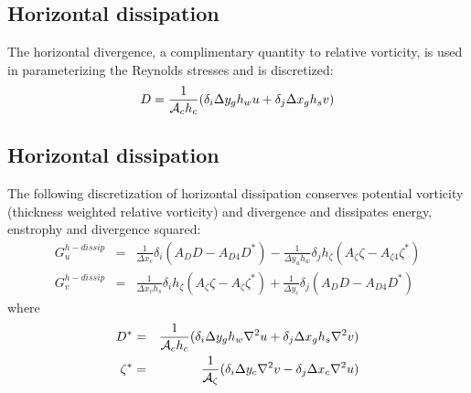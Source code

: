 \subsection{Horizontal dissipation}

The horizontal divergence, a complimentary quantity to relative
vorticity, is used in parameterizing the Reynolds stresses and is
discretized:
\begin{equation}
D = \frac{1}{{\cal A}_c h_c} (
  \delta_i \Delta y_g h_w u
+ \delta_j \Delta x_g h_s v )
\end{equation}



\subsection{Horizontal dissipation}

The following discretization of horizontal dissipation conserves
potential vorticity (thickness weighted relative vorticity) and
divergence and dissipates energy, enstrophy and divergence squared:
\begin{eqnarray}
G_u^{h-dissip} & = &
  \frac{1}{\Delta x_c} \delta_i ( A_D D - A_{D4} D^*)
- \frac{1}{\Delta y_u h_w} \delta_j h_\zeta ( A_\zeta \zeta - A_{\zeta4} \zeta^* )
\\
G_v^{h-dissip} & = &
  \frac{1}{\Delta x_v h_s} \delta_i h_\zeta ( A_\zeta \zeta - A_\zeta \zeta^* )
+ \frac{1}{\Delta y_c} \delta_j ( A_D D - A_{D4} D^* )
\end{eqnarray}
where
\begin{eqnarray}
D^* & = & \frac{1}{{\cal A}_c h_c} (
  \delta_i \Delta y_g h_w \nabla^2 u
+ \delta_j \Delta x_g h_s \nabla^2 v ) \\
\zeta^* & = & \frac{1}{{\cal A}_\zeta} (
  \delta_i \Delta y_c \nabla^2 v
- \delta_j \Delta x_c \nabla^2 u )
\end{eqnarray}



